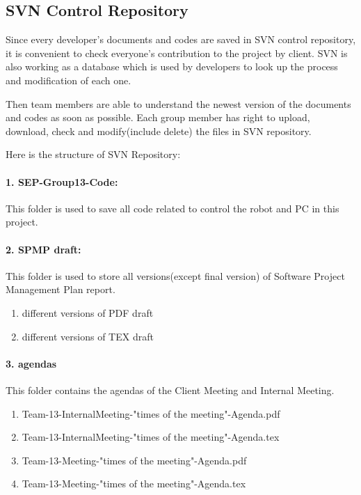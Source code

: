 \documentclass[11pt, a4paper]{report}
\begin{document}
\subsection{SVN Control Repository}
Since every developer's documents and codes are saved in SVN control repository, it is convenient to check everyone's contribution to the project by client. SVN is also working as a database which is used by developers to look up the process and modification of each one.

Then team members are able to understand the newest version of the documents and codes as soon as possible. Each group member has right to upload, download, check and modify(include delete) the files in SVN repository.

Here is the structure of SVN Repository:
\paragraph{1. SEP-Group13-Code:}
This folder is used to save all code related to control the robot and PC  in this project. 
\paragraph{2. SPMP draft:}
This folder is used to store all versions(except final version) of Software Project Management Plan report.

\begin{enumerate}
 	\item different versions of PDF draft
 	\item different versions of TEX draft 
\end{enumerate}

\paragraph{3. agendas}
This folder contains the agendas of the Client Meeting and Internal Meeting.

\begin{enumerate}
	\item Team-13-InternalMeeting-"times of the meeting"-Agenda.pdf
	\item Team-13-InternalMeeting-"times of the meeting"-Agenda.tex
	\item Team-13-Meeting-"times of the meeting"-Agenda.pdf
	\item Team-13-Meeting-"times of the meeting"-Agenda.tex
\end{enumerate}
\end{document}
